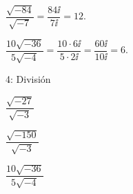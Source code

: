 
\begin{ejemplos}
  \item \(\dfrac{\sqrt{-84}}{\sqrt{-7}}=\dfrac{84\ii}{7\ii}=12\).
  \item \(\dfrac{10\sqrt{-36}}{5\sqrt{-4}}=\dfrac{10\cdot 6\ii}{5\cdot 2\ii}=\dfrac{60\ii}{10\ii}=6\).
\end{ejemplos}

\begin{actividad}{4: División}
  \item \(\dfrac{\sqrt{-27}}{\sqrt{-3}}\)
  \item \(\dfrac{\sqrt{-150}}{\sqrt{-3}}\)
  \item \(\dfrac{10\sqrt{-36}}{5\sqrt{-4}}\)
\end{actividad}